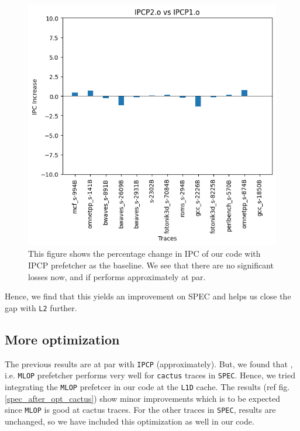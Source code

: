 \documentclass[conference]{IEEEtran}
\begin{document}
\begin{figure}
\includegraphics[scale=0.5]{Images/Bingo/spec_compare.png}
\caption{This figure shows the percentage change in IPC of our code with IPCP prefetcher as the baseline. We see that there are no significant losses now, and if performs approximately at par.}
\label{spec_after_opt}
\end{figure}

Hence, we find that this yields an improvement on SPEC and helps us close the gap with \verb|L2| further.

\subsection{More optimization}
The previous results are at par with \verb|IPCP| (approximately). But, we found that \cite{b3}, i.e. \verb|MLOP| prefetcher performs very well for \verb|cactus| traces in \verb|SPEC|. Hence, we tried integrating the \verb|MLOP| prefetcer in our code at the \verb|L1D| cache. The results (ref fig. \ref{spec_after_opt_cactus}) show minor improvements which is to be expected since \verb|MLOP| is good at cactus traces. For the other traces in \verb|SPEC|, results are unchanged, so we have included this optimization as well in our code.
\end{document}
